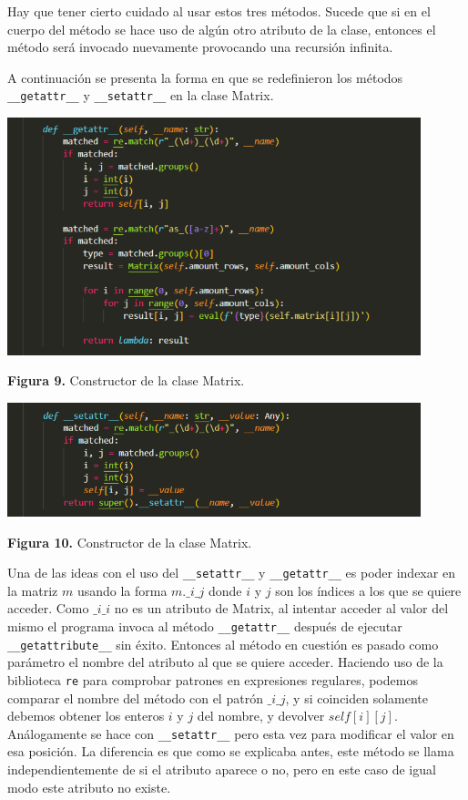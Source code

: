 \documentclass[10pt]{article} %
\newcommand{\csl}[1]{\colorbox{backcolour}{\texttt{#1}}}
\newcommand{\imgcaption}[2]{\tiny \textbf{Figura #1.} #2.}
\newcommand{\mgc}[2][]{\colorbox{backcolour}{\texttt{\_\_#2\_\_#1}}}
\begin{document}
Hay que tener cierto cuidado al usar estos tres m\'etodos. Sucede que si en el cuerpo del m\'etodo se hace uso de alg\'un otro atributo de la clase, entonces el m\'etodo ser\'a invocado nuevamente provocando una recursi\'on infinita.

A continuaci\'on se presenta la forma en que se redefinieron los m\'etodos \mgc{getattr} y \mgc{setattr} en la clase Matrix.

\begin{center}
	\includegraphics[width=12cm]{getattr.png} 
	
	\imgcaption{9}{Constructor de la clase Matrix}
\end{center}

\begin{center}
	\includegraphics[width=12cm]{setattr.png}
	
	\imgcaption{10}{Constructor de la clase Matrix}
\end{center}

Una de las ideas con el uso del \mgc{setattr} y \mgc{getattr} es poder indexar en la matriz $m$ usando la forma \csl{$m.\_i\_j$} donde $i$ y $j$ son los \'indices a los que se quiere acceder. Como \csl{$\_i\_i$} no es un atributo de Matrix, al intentar acceder al valor del mismo el programa invoca al m\'etodo \mgc{getattr} despu\'es de ejecutar \mgc{getattribute} sin \'exito. Entonces al m\'etodo en cuesti\'on es pasado como par\'ametro el nombre del atributo al que se quiere acceder. Haciendo uso de la biblioteca \csl{re} para comprobar patrones en expresiones regulares, podemos comparar el nombre del m\'etodo con el patr\'on \csl{$\_i\_j$}, y si coinciden solamente debemos obtener los enteros $i$ y $j$ del nombre, y devolver \csl{$self[i][j]$}. An\'alogamente se hace con \mgc{setattr} pero esta vez para modificar el valor en esa posici\'on. La diferencia es que como se explicaba antes, este m\'etodo se llama independientemente de si el atributo aparece o no, pero en este caso de igual modo este atributo no existe.
\end{document}
